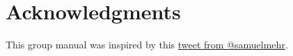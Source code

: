 \documentclass[fleqn,10pt]{wlscirep}
\begin{document}




\newpage
\section{Acknowledgments}

This group manual was inspired by this \href{https://twitter.com/samuelmehr/status/1139733291899080705}{tweet from @samuelmehr}.






\end{document}
